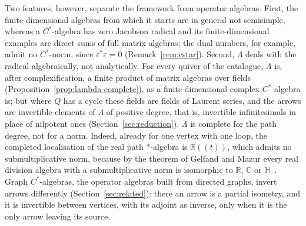 \documentclass[12pt, a4paper]{report}
\theoremstyle{plain}
\theoremstyle{definition}
\theoremstyle{remark}
\theoremstyle{plain}
\newcommand{\RR}{\mathbb{R}}
\newcommand{\CC}{\mathbb{C}}
\newcommand{\HH}{\mathbb{H}}
\begin{document}
Two features, however, separate the framework from operator algebras. First, the finite-dimensional algebras from which it starts are in general not semisimple, whereas a $C^*$-algebra has zero Jacobson radical and its finite-dimensional examples are direct sums of full matrix algebras; the dual numbers, for example, admit no $C^*$-norm, since $\varepsilon^*\varepsilon=0$ (Remark~\ref{rem:cstar}). Second, $\Lambda$ deals with the radical algebraically, not analytically. For every quiver of the catalogue, $\Lambda$ is, after complexification, a finite product of matrix algebras over fields (Proposition~\ref{prop:lambda-complete}), as a finite-dimensional complex $C^*$-algebra is; but where $Q$ has a cycle these fields are fields of Laurent series, and the arrows are invertible elements of $\Lambda$ of positive degree, that is, invertible infinitesimals in place of nilpotent ones (Section~\ref{sec:reduction}). $\Lambda$ is complete for the path degree, not for a norm. Indeed, already for one vertex with one loop, the completed localisation of the real path $*$-algebra is $\RR((t))$, which admits no submultiplicative norm, because by the theorem of Gelfand and Mazur every real division algebra with a submultiplicative norm is isomorphic to $\RR$, $\CC$ or $\HH$~\cite{Zelazko1973}. Graph $C^*$-algebras, the operator algebras built from directed graphs, invert arrows differently (Section~\ref{sec:related}): there an arrow is a partial isometry, and it is invertible between vertices, with its adjoint as inverse, only when it is the only arrow leaving its source.
\end{document}
